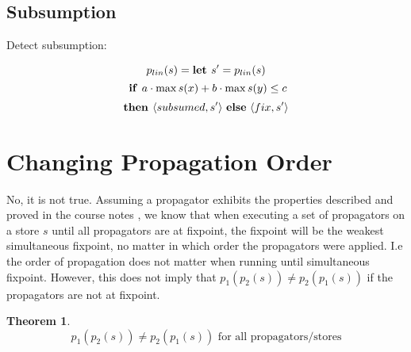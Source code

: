\documentclass[a4paper, 11pt]{article}
\newtheorem{theorem}{Theorem}[section]
\begin{document}
\subsection*{Subsumption}
Detect subsumption:

$$p_{lin}(s) =  \text{\textbf{let }} s' = p_{lin}(s)$$
$$\text{ \textbf{if }} a \cdot \max s(x) + b \cdot \max s(y) \leq c$$
$$\text{\textbf{then }} \langle subsumed, s' \rangle \text{ \textbf{else} } \langle fix, s' \rangle$$


\section*{Changing Propagation Order}
No, it is not true. Assuming a propagator exhibits the properties described and proved in the course notes \citep{schulte_notes}, we know that when executing a set of propagators on a store $s$ until all propagators are at fixpoint, the fixpoint will be the weakest simultaneous fixpoint, no matter in which order the propagators were applied. I.e the order of propagation does not matter when running until simultaneous fixpoint. However, this does not imply that $p_1(p_2(s)) \neq p_2(p_1(s))$ if the propagators are not at fixpoint. 

\begin{theorem}
$$p_1(p_2(s)) \neq p_2(p_1(s)) \text{  for all propagators/stores}$$ 
\end{theorem}
\end{document}
